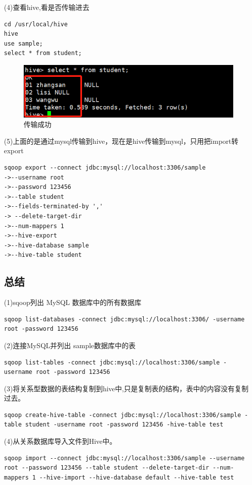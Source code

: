 \documentclass[12pt]{article}
\begin{document}
(4)查看hive,看是否传输进去

\begin{lstlisting}[language={[ANSI]C}]
cd /usr/local/hive
hive
use sample;
select * from student;
\end{lstlisting}

\begin{figure}[ht]
\centering
\includegraphics[scale=1.3]{figures/26.png}
\caption{传输成功}\label{fig:label2}
\end{figure}

(5)上面的是通过mysql传输到hive，现在是hive传输到mysql，只用把import转export
\begin{lstlisting}[language={[ANSI]C}]
sqoop export --connect jdbc:mysql://localhost:3306/sample
->--username root
->--password 123456
->--table student
->--fields-terminated-by ','
-> --delete-target-dir
->--num-mappers 1
->--hive-export
->--hive-database sample
->--hive-table student
\end{lstlisting}

\subsection{总结}

(1)sqoop列出 MySQL 数据库中的所有数据库
\begin{lstlisting}
sqoop list-databases -connect jdbc:mysql://localhost:3306/ -username root -password 123456
\end{lstlisting}

(2)连接MySQL并列出 sample数据库中的表
\begin{lstlisting}
sqoop list-tables -connect jdbc:mysql://localhost:3306/sample -username root -password 123456
\end{lstlisting}

(3)将关系型数据的表结构复制到hive中,只是复制表的结构，表中的内容没有复制过去。
\begin{lstlisting}
sqoop create-hive-table -connect jdbc:mysql://localhost:3306/sample -table student -username root -password 123456 -hive-table test
\end{lstlisting}

(4)从关系数据库导入文件到Hive中。
\begin{lstlisting}
sqoop import --connect jdbc:mysql://localhost:3306/sample --username root --password 123456 --table student --delete-target-dir --num-mappers 1 --hive-import --hive-database default --hive-table test
\end{lstlisting}
\end{document}
